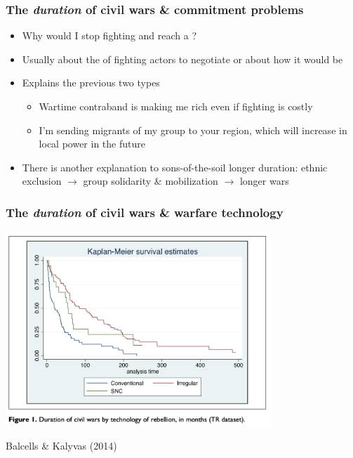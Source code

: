 \documentclass[aspectratio=43]{beamer}
\begin{document}
\begin{frame}
\frametitle{The \textit{duration} of civil wars \& commitment problems}
\centering

\begin{itemize}[<+->]
  \item Why would I stop fighting and reach a {}?
  \item Usually about the {\color{red}{incentives}} of fighting actors to negotiate or about how {\color{red}{credible}} it would be
  \item Explains the previous two types
  \begin{itemize}
    \item Wartime contraband is making me rich even if fighting is costly
    \item I'm sending migrants of my group to your region, which will increase in local power in the future
  \end{itemize}
  \item There is another explanation to sons-of-the-soil longer duration:
        ethnic exclusion $\rightarrow$ group solidarity \& mobilization $\rightarrow$ longer wars
\end{itemize}

\end{frame}

\begin{frame}
\frametitle{The \textit{duration} of civil wars \& warfare technology}
\centering

\includegraphics[width = 0.75\textwidth]{img/balcells_kalyvas_duration}

\begin{itemize}
\end{itemize}

{\scriptsize Balcells \& Kalyvas (2014)}

\end{frame}
\end{document}
